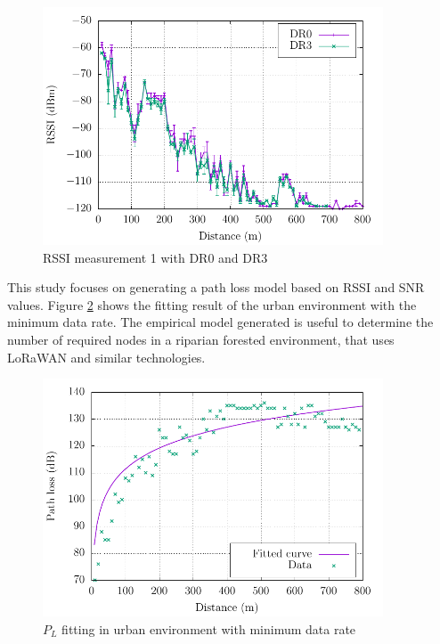 \begin{figure}[h!]
  \centering
  \includegraphics[width=0.9\textwidth]{./figures/Figure4/Figure4.pdf}
  \caption{RSSI measurement 1 with DR$0$ and DR$3$}
  \label{fig:rssimeasurement}
\end{figure}

This study focuses on generating a path loss model based on RSSI and SNR values. Figure \ref{fig:plfittiing} shows the fitting result of the urban environment with the minimum data rate. The empirical model generated is useful to determine the number of required nodes in a riparian forested environment, that uses LoRaWAN and similar technologies.

\begin{figure}[h!]
  \centering
  \includegraphics[width=0.9\textwidth]{./figures/Figure5/Figure5.pdf}
  \caption{$P_L$ fitting in urban environment with minimum data rate}
  \label{fig:plfittiing}
\end{figure}

